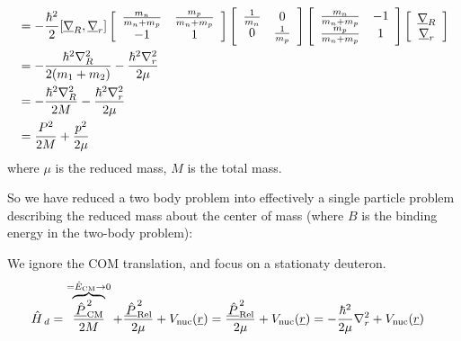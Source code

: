 \documentclass{school-22.101-notes}
\begin{document}
\begin{enumerate}
\begin{align}
 &= - \frac{\hbar^2}{2} [ \underline{\nabla}_R, \underline{\nabla}_r] 
\left[ \begin{array}{cc} \frac{m_n}{m_n+m_p} & \frac{m_p}{m_n+ m_p} \\ -1 & 1 \end{array} \right]
\left[ \begin{array}{cc} \frac{1}{m_n} & 0 \\ 0 & \frac{1}{m_p} \end{array} \right] 
\left[ \begin{array}{cc} \frac{m_n}{m_n+m_p} & -1 \\ \frac{m_p}{m_n+ m_p} & 1 \end{array} \right]
\left[ \begin{array}{c} \underline{\nabla}_R \\ \underline{\nabla}_r \end{array} \right] \\
&= - \frac{\hbar^2 \nabla^2_R}{2 (m_1 + m_2)} - \frac{\hbar^2 \nabla^2_r}{2 \mu} \\
&= - \frac{\hbar^2 \nabla^2_R}{2M} - \frac{\hbar^2 \nabla^2_r}{2 \mu}  \\
&= \frac{P^2}{2M} + \frac{p^2}{2\mu} 
\end{align}
where $\mu$ is the reduced mass, $M$ is the total mass. 


So we have reduced a two body problem into effectively a single particle problem describing the reduced mass about the center of mass (where $B$ is the binding energy in the two-body problem): 

We ignore the COM translation, and focus on a stationaty deuteron. 
\begin{align}
\left. \hat{H} \right._d &= \overbrace{\frac{\underline{\left. \hat{P} \right.}_{\mathrm{CM}}^2}{2M}}^{ = \hat{E}_{\mathrm{CM}} \to  0} + \frac{\underline{\left. \hat{P} \right.}_{\mathrm{Rel}}^2}{2\mu} + V_{\mathrm{nuc}} (\underline{r}) = \frac{\underline{\left. \hat{P} \right.}_{\mathrm{Rel}}^2}{2\mu} + V_{\mathrm{nuc}} (\underline{r}) = -\frac{\hbar^2}{2 \mu} \nabla_r^2 + V_{\mathrm{nuc}} (\underline{r}) 
\end{align}



\end{enumerate}
\end{document}
